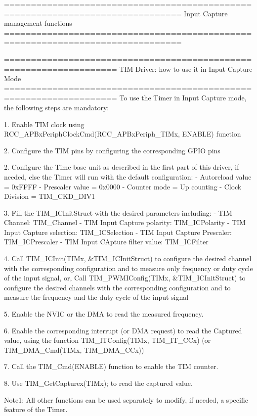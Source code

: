 \begin{DoxyVerb} ===============================================================================
                      Input Capture management functions
 ===============================================================================  
   
       ===================================================================      
              TIM Driver: how to use it in Input Capture Mode
       =================================================================== 
       To use the Timer in Input Capture mode, the following steps are mandatory:
       
       1. Enable TIM clock using RCC_APBxPeriphClockCmd(RCC_APBxPeriph_TIMx, ENABLE) function
       
       2. Configure the TIM pins by configuring the corresponding GPIO pins
       
       2. Configure the Time base unit as described in the first part of this driver,
          if needed, else the Timer will run with the default configuration:
          - Autoreload value = 0xFFFF
          - Prescaler value = 0x0000
          - Counter mode = Up counting
          - Clock Division = TIM_CKD_DIV1
          
       3. Fill the TIM_ICInitStruct with the desired parameters including:
          - TIM Channel: TIM_Channel
          - TIM Input Capture polarity: TIM_ICPolarity
          - TIM Input Capture selection: TIM_ICSelection
          - TIM Input Capture Prescaler: TIM_ICPrescaler
          - TIM Input CApture filter value: TIM_ICFilter
       
       4. Call TIM_ICInit(TIMx, &TIM_ICInitStruct) to configure the desired channel with the 
          corresponding configuration and to measure only frequency or duty cycle of the input signal,
          or,
          Call TIM_PWMIConfig(TIMx, &TIM_ICInitStruct) to configure the desired channels with the 
          corresponding configuration and to measure the frequency and the duty cycle of the input signal
          
       5. Enable the NVIC or the DMA to read the measured frequency. 
          
       6. Enable the corresponding interrupt (or DMA request) to read the Captured value,
          using the function TIM_ITConfig(TIMx, TIM_IT_CCx) (or TIM_DMA_Cmd(TIMx, TIM_DMA_CCx)) 
       
       7. Call the TIM_Cmd(ENABLE) function to enable the TIM counter.
       
       8. Use TIM_GetCapturex(TIMx); to read the captured value.
       
       Note1: All other functions can be used separately to modify, if needed,
              a specific feature of the Timer. \end{DoxyVerb}
 


